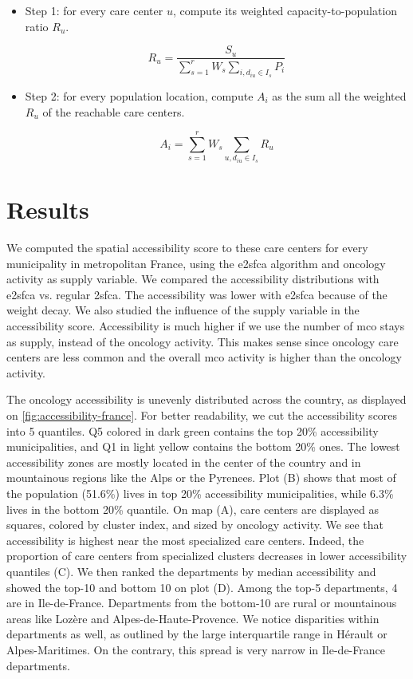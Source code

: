 \begin{itemize}
    \item Step 1: for every care center $u$, compute its weighted capacity-to-population ratio $R_u$.

    \begin{equation}
    R_u =  \frac{S_u}{\sum_{s=1}^{r} W_s \sum_{i, d_{iu} \in I_s} P_i}
    \end{equation}

    \item Step 2: for every population location, compute $A_i$ as the sum all the weighted $R_u$ of the reachable care centers.

    \begin{equation}
    A_i = \sum_{s=1}^{r} W_s \sum_{u, d_{iu} \in I_s} R_u
    \end{equation}
\end{itemize}
\section{Results}

We computed the spatial accessibility score to these care centers for every municipality in metropolitan France, using the \ac{e2sfca} algorithm and oncology activity as supply variable. We compared the accessibility distributions with \ac{e2sfca} vs. regular \ac{2sfca}. The accessibility was lower with \ac{e2sfca} because of the weight decay. We also studied the influence of the supply variable in the accessibility score. Accessibility is much higher if we use the number of \ac{mco} stays as supply, instead of the oncology activity. This makes sense since oncology care centers are less common and the overall \ac{mco} activity is higher than the oncology activity.

The oncology accessibility is unevenly distributed across the country, as displayed on \cref{fig:accessibility-france}. For better readability, we cut the accessibility scores into 5 quantiles. Q5 colored in dark green contains the top 20\% accessibility municipalities, and Q1 in light yellow contains the bottom 20\% ones. The lowest accessibility zones are mostly located in the center of the country and in mountainous regions like the Alps or the Pyrenees. Plot (B) shows that most of the population (51.6\%) lives in top 20\% accessibility municipalities, while 6.3\% lives in the bottom 20\% quantile. On map (A), care centers are displayed as squares, colored by cluster index, and sized by oncology activity. We see that accessibility is highest near the most specialized care centers. Indeed, the proportion of care centers from specialized clusters decreases in lower accessibility quantiles (C). We then ranked the departments by median accessibility and showed the top-10 and bottom 10 on plot (D). Among the top-5 departments, 4 are in Ile-de-France. Departments from the bottom-10 are rural or mountainous areas like Lozère and Alpes-de-Haute-Provence.  We notice disparities within departments as well, as outlined by the large interquartile range in Hérault or Alpes-Maritimes. On the contrary, this spread is very narrow in Ile-de-France departments.

